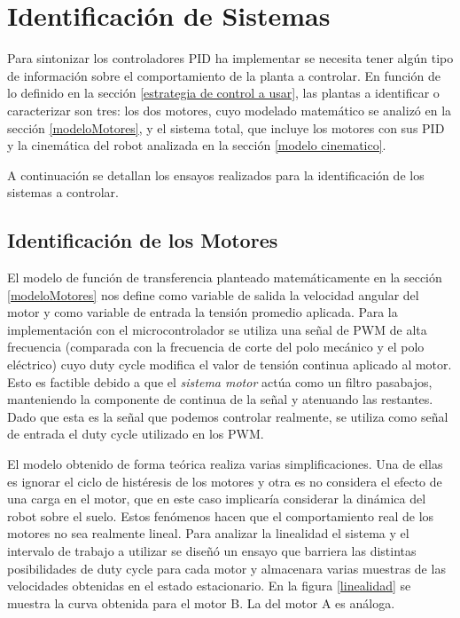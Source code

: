 \documentclass[10pt,conference,a4paper,onecolumn]{article}%
\begin{document}
\section{Identificación de Sistemas}
\label{identifSist}
Para sintonizar los controladores PID ha implementar se necesita tener algún tipo de información sobre el comportamiento de la planta a controlar. En función de lo definido en la sección \ref{estrategia de control a usar}, las plantas a identificar o caracterizar son tres: los dos motores, cuyo modelado matemático se analizó en la sección \ref{modeloMotores}, y el sistema total, que incluye los motores con sus PID y la cinemática del robot analizada en la sección \ref{modelo cinematico}.

A continuación se detallan los ensayos realizados para la identificación de los sistemas a controlar.
\subsection{Identificación de los Motores}
El modelo de función de transferencia planteado matemáticamente en la sección \ref{modeloMotores} nos define como variable de salida la velocidad angular del motor y como variable de entrada la tensión promedio aplicada. Para la implementación con el microcontrolador se utiliza una señal de PWM de alta frecuencia (comparada con la frecuencia de corte del polo mecánico y el polo eléctrico) cuyo duty cycle modifica el valor de tensión continua aplicado al motor. Esto es factible debido a que el \textit{ sistema motor} actúa como un filtro pasabajos, manteniendo la componente de continua de la señal y atenuando las restantes. Dado que esta es la señal que podemos controlar realmente, se utiliza como señal de entrada el duty cycle utilizado en los PWM.

El modelo obtenido de forma teórica realiza varias simplificaciones. Una de ellas es ignorar el ciclo de histéresis de los motores y otra es no considera el efecto de una carga en el motor, que en este caso implicaría considerar la dinámica del robot sobre el suelo. Estos fenómenos hacen que el comportamiento real de los motores no sea realmente lineal. Para analizar la linealidad el sistema y el intervalo de trabajo a utilizar se diseñó un ensayo que barriera las distintas posibilidades de duty cycle para cada motor y almacenara varias muestras de las velocidades obtenidas en el estado estacionario. En la figura \ref{linealidad} se muestra la curva obtenida para el motor B. La del motor A es análoga. %
\end{document}

